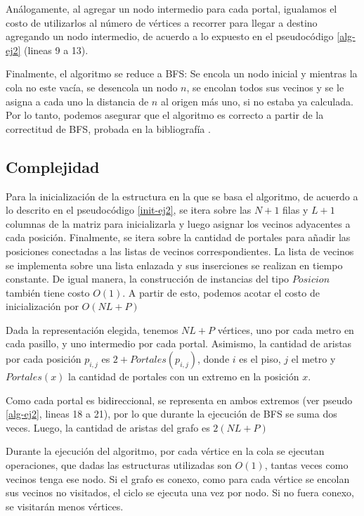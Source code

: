 Análogamente, al agregar un nodo intermedio para cada portal, igualamos el costo de utilizarlos al número de vértices a recorrer para llegar a destino agregando un nodo intermedio, de acuerdo a lo expuesto en el pseudocódigo \ref{alg-ej2} (lineas 9 a 13). 

Finalmente, el algoritmo se reduce a BFS: Se encola un nodo inicial y mientras la cola no este vacía, se desencola un nodo $n$, se encolan todos sus vecinos y se le asigna a cada uno la distancia de $n$ al origen más uno, si no estaba ya calculada.
Por lo tanto, podemos asegurar que el algoritmo es correcto a partir de la correctitud de BFS, probada en la bibliografía \cite{Cormen}.


\subsection{Complejidad}

Para la inicialización de la estructura en la que se basa el algoritmo, de acuerdo a lo descrito en el pseudocódigo \ref{init-ej2}, se itera sobre las $N+1$ filas y $L+1$ columnas de la matriz para inicializarla y luego asignar los vecinos adyacentes a cada posición. Finalmente, se itera sobre la cantidad de portales para añadir las posiciones conectadas a las listas de vecinos correspondientes. La lista de vecinos se implementa sobre una lista enlazada y sus inserciones se realizan en tiempo constante. De igual manera, la construcción de instancias del tipo $Posicion$ también tiene costo $O(1)$. A partir de esto, podemos acotar el costo de inicialización por $O(NL + P)$


Dada la representación elegida, tenemos $NL + P$ vértices, uno por cada metro en cada pasillo, y uno intermedio por cada portal.
Asimismo, la cantidad de aristas por cada posición $p_{i,j}$ es $2 + Portales(p_{i,j})$, donde $i$ es el piso, $j$ el metro y $Portales(x)$ la cantidad de portales con un extremo en la posición $x$.

Como cada portal es bidireccional, se representa en ambos extremos (ver pseudo \ref{alg-ej2}, lineas 18 a 21), por lo que durante la ejecución de BFS se suma dos veces.
Luego, la cantidad de aristas del grafo es $2 (NL + P)$

Durante la ejecución del algoritmo, por cada vértice en la cola se ejecutan operaciones, que dadas las estructuras utilizadas son $O(1)$, tantas veces como vecinos tenga ese nodo.
Si el grafo es conexo, como para cada vértice se encolan sus vecinos no visitados, el ciclo se ejecuta una vez por nodo. Si no fuera conexo, se visitarán menos vértices.


